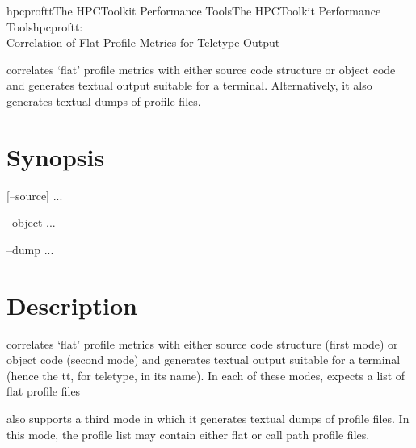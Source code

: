 \documentclass[english]{article}
\begin{document}
\begin{Name}{1}{hpcproftt}{The HPCToolkit Performance Tools}{The HPCToolkit Performance Tools}{hpcproftt:\\ Correlation of Flat Profile Metrics for Teletype Output}

 correlates `flat' profile metrics with either source code structure or object code and generates textual output suitable for a terminal.
Alternatively, it also generates textual dumps of profile files.

\end{Name}

\section{Synopsis}

 [--source]  ...

 --object  ...

 --dump ...


\section{Description}

 correlates `flat' profile metrics with either source code structure (first mode) or object code (second mode) and generates textual output suitable for a terminal (hence the tt, for teletype, in its name).
In each of these modes,  expects a list of flat profile files 

 also supports a third mode in which it generates textual dumps of profile files.
In this mode, the profile list may contain either flat or call path profile files.
\end{document}
